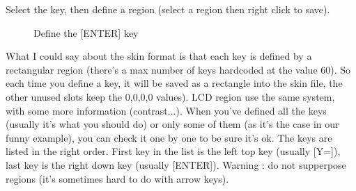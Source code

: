 \documentclass[10pt]{report}
\newcommand{\calckey}[1]{\textsf{[#1]}}
\begin{document}
Select the key, then define a region (select a region then right click to save).\newline
\begin{figure}[H]
\centering
{}
\caption{Define the \calckey{ENTER} key}
\end{figure}
What I could say about the skin format is that each key is defined by a rectangular region (there's a max number of keys hardcoded at the value 60).\newline
So each time you define a key, it will be saved as a rectangle into the skin file, the other unused slots keep the 0,0,0,0 values).\newline
LCD region use the same system, with some more information (contrast...).\newline\newline
When you've defined all the keys (usually it's what you should do) or only some of them (as it's the case in our funny example), you can check it one by one to be sure it's ok.\newline
The keys are listed in the right order. First key in the list is the left top key (usually \calckey{Y=}), last key is the right down key (usually \calckey{ENTER}).\newline
Warning : do not supperpose regions (it's sometimes hard to do with arrow keys).\newline
\end{document}
